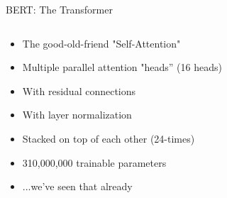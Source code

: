 \documentclass[12pt]{beamer}
\begin{document}
\begin{frame}{BERT: The Transformer}
	
	\begin{columns}
		\begin{column}{0.6\linewidth}
			\begin{itemize}
				\item The good-old-friend "Self-Attention"
				\item Multiple parallel attention "heads” (16 heads)
				\item With residual connections
				\item With layer normalization
				\item Stacked on top of each other (24-times)
				\item 310,000,000 trainable parameters
				\item ...we've seen that already
			\end{itemize}
		\end{column}
		\begin{column}{0.3\linewidth}
			\begin{figure}

\end{figure}
\end{column}
\end{columns}
\end{frame}
\end{document}
